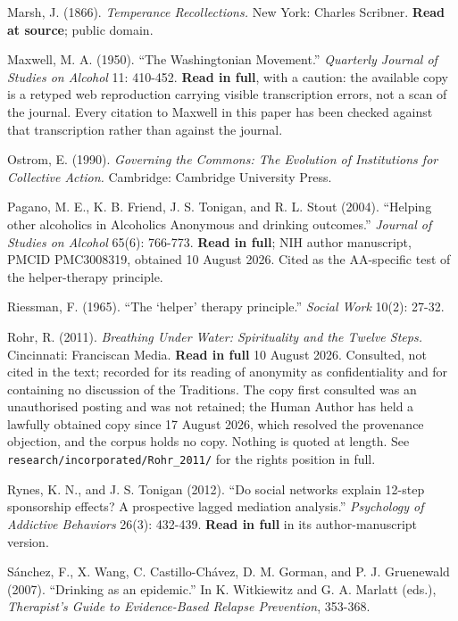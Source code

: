 \documentclass[11pt,a4paper]{article}
\begin{document}
\begin{list}{}{\setlength{\leftmargin}{1.5em}\setlength{\itemindent}{-1.5em}\setlength{\itemsep}{2pt}}
\item Marsh, J. (1866). \textit{Temperance Recollections.} New York: Charles Scribner. \textbf{Read at source}; public domain.

\item Maxwell, M. A. (1950). ``The Washingtonian Movement.'' \textit{Quarterly Journal of Studies on Alcohol} 11: 410-452. \textbf{Read in full}, with a caution: the available copy is a retyped web reproduction carrying visible transcription errors, not a scan of the journal. Every citation to Maxwell in this paper has been checked against that transcription rather than against the journal.

\item Ostrom, E. (1990). \textit{Governing the Commons: The Evolution of Institutions for Collective Action.} Cambridge: Cambridge University Press.

\item Pagano, M. E., K. B. Friend, J. S. Tonigan, and R. L. Stout (2004). ``Helping other alcoholics in Alcoholics Anonymous and drinking outcomes.'' \textit{Journal of Studies on Alcohol} 65(6): 766-773. \textbf{Read in full}; NIH author manuscript, PMCID PMC3008319, obtained 10 August 2026. Cited as the AA-specific test of the helper-therapy principle.

\item Riessman, F. (1965). ``The `helper' therapy principle.'' \textit{Social Work} 10(2): 27-32.

\item Rohr, R. (2011). \textit{Breathing Under Water: Spirituality and the Twelve Steps.} Cincinnati: Franciscan Media. \textbf{Read in full} 10 August 2026. Consulted, not cited in the text; recorded for its reading of anonymity as confidentiality and for containing no discussion of the Traditions. The copy first consulted was an unauthorised posting and was not retained; the Human Author has held a lawfully obtained copy since 17 August 2026, which resolved the provenance objection, and the corpus holds no copy. Nothing is quoted at length. See \texttt{research/incorporated/Rohr\_2011/} for the rights position in full.

\item Rynes, K. N., and J. S. Tonigan (2012). ``Do social networks explain 12-step sponsorship effects? A prospective lagged mediation analysis.'' \textit{Psychology of Addictive Behaviors} 26(3): 432-439. \textbf{Read in full} in its author-manuscript version.

\item S\'anchez, F., X. Wang, C. Castillo-Ch\'avez, D. M. Gorman, and P. J. Gruenewald (2007). ``Drinking as an epidemic.'' In K. Witkiewitz and G. A. Marlatt (eds.), \textit{Therapist's Guide to Evidence-Based Relapse Prevention}, 353-368.


\end{list}
\end{document}
